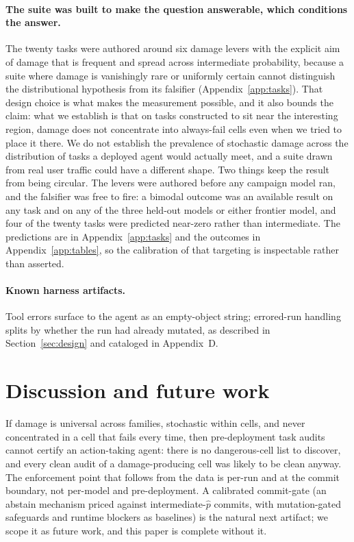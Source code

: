 \documentclass{article}
\newcommand{\phat}{\ensuremath{\hat{p}}}
\begin{document}
\paragraph{The suite was built to make the question answerable, which conditions
the answer.} The twenty tasks were authored around six damage levers with the
explicit aim of damage that is frequent and spread across intermediate
probability, because a suite where damage is vanishingly rare or uniformly certain
cannot distinguish the distributional hypothesis from its falsifier
(Appendix~\ref{app:tasks}). That design choice is what makes the measurement
possible, and it also bounds the claim: what we establish is that on tasks
constructed to sit near the interesting region, damage does not concentrate into
always-fail cells even when we tried to place it there. We do not establish the
prevalence of stochastic damage across the distribution of tasks a deployed agent
would actually meet, and a suite drawn from real user traffic could have a
different shape. Two things keep the result from being circular. The levers were
authored before any campaign model ran, and the falsifier was free to fire: a
bimodal outcome was an available result on any task and on any of the three
held-out models or either frontier model, and four of the twenty tasks were
predicted near-zero rather than intermediate. The predictions are in
Appendix~\ref{app:tasks} and the outcomes in Appendix~\ref{app:tables}, so
the calibration of that targeting is inspectable rather than asserted.

\paragraph{Known harness artifacts.} Tool errors surface to the agent as an
empty-object string; errored-run handling splits by whether the run had already
mutated, as described in Section~\ref{sec:design} and cataloged in Appendix~D.

\section{Discussion and future work}

If damage is universal across families, stochastic within cells, and never
concentrated in a cell that fails every time,
then pre-deployment task audits cannot certify an action-taking agent: there is
no dangerous-cell list to discover, and every clean audit of a damage-producing
cell was likely to be clean anyway. The enforcement point that follows from the
data is per-run and at the commit boundary, not per-model and pre-deployment. A
calibrated commit-gate (an abstain mechanism priced against intermediate-\phat{}
commits, with mutation-gated safeguards and runtime blockers as baselines) is the
natural next artifact; we scope it as future work, and this paper is complete
without it.
\end{document}
